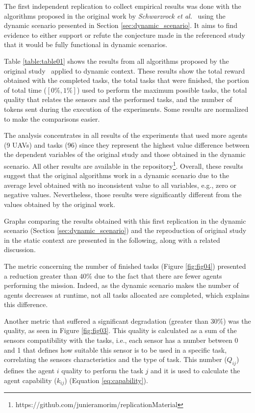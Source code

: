 
The first independent replication to collect empirical results was done with the algorithms proposed in the original work by \textit{Schwarzrock et al.}~\cite{MAS07} using the dynamic scenario presented in Section \ref{sec:dynamic_scenario}. It aims to find evidence to either support or refute the conjecture made in the referenced study that it would be fully functional in dynamic scenarios. 

Table \ref{table:table01} shows the results from all algorithms proposed by the original study~\cite{MAS07} applied to dynamic context. These results show the total reward obtained with the completed tasks, the total tasks that were finished, the portion of total time ($[0\%,1\%]$) used to perform the maximum possible tasks, the total quality that relates the sensors and the performed tasks, and the number of tokens sent during the execution of the experiments. Some results are normalized to make the comparisons easier. 



The analysis concentrates in all results of the experiments that used more agents (9 UAVs) and tasks (96) since they represent the highest value difference between the dependent variables of the original study and those obtained in the dynamic scenario. All other results are available in the repository\footnote{https://github.com/junieramorim/replicationMaterial}. Overall, these results suggest that the original algorithms work in a dynamic scenario due to the average level obtained with no inconsistent value to all variables, e.g., zero or negative values. Nevertheless, those results were significantly different from the values obtained by the original work.

Graphs comparing the results obtained with this first replication in the dynamic scenario (Section \ref{sec:dynamic_scenario}) and the reproduction of original study in the static context are presented in the following, along with a related discussion.

The metric concerning the number of finished tasks (Figure \ref{fig:fig04}) presented a reduction greater than $40\%$ due to the fact that there are fewer agents performing the mission. Indeed, as the dynamic scenario makes the number of agents decreases at runtime, not all tasks allocated are completed, which explains this difference. 

Another metric that suffered a significant degradation (greater than $30\%$) was the quality, as seen in Figure \ref{fig:fig03}. This quality is calculated as a sum of the sensors compatibility with the tasks, i.e., each sensor has a number between 0 and 1 that defines how suitable this sensor is to be used in a specific task, correlating the sensors characteristics and the type of task. This number ($Q_{ij}$) defines the agent $i$ quality to perform the task $j$ and it is used to calculate the agent capability ($k_{ij}$) (Equation \ref{eq:capability}).

